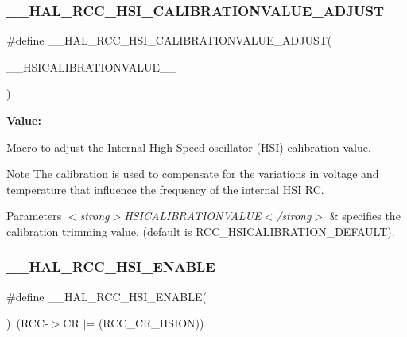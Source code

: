 \subsubsection{\texorpdfstring{\_\_HAL\_RCC\_HSI\_CALIBRATIONVALUE\_ADJUST}{\_\_HAL\_RCC\_HSI\_CALIBRATIONVALUE\_ADJUST}}
{\footnotesize\ttfamily \#define \+\_\+\+\_\+\+H\+A\+L\+\_\+\+R\+C\+C\+\_\+\+H\+S\+I\+\_\+\+C\+A\+L\+I\+B\+R\+A\+T\+I\+O\+N\+V\+A\+L\+U\+E\+\_\+\+A\+D\+J\+U\+ST(\begin{DoxyParamCaption}\item[{}]{\+\_\+\+\_\+\+H\+S\+I\+C\+A\+L\+I\+B\+R\+A\+T\+I\+O\+N\+V\+A\+L\+U\+E\+\_\+\+\_\+ }\end{DoxyParamCaption})}

{\bfseries Value\+:}
\begin{DoxyCode}{0}

\end{DoxyCode}


Macro to adjust the Internal High Speed oscillator (H\+SI) calibration value. 

\begin{DoxyNote}{Note}
The calibration is used to compensate for the variations in voltage and temperature that influence the frequency of the internal H\+SI RC. 
\end{DoxyNote}

\begin{DoxyParams}{Parameters}
{\em $<$strong$>$\+H\+S\+I\+C\+A\+L\+I\+B\+R\+A\+T\+I\+O\+N\+V\+A\+L\+U\+E$<$/strong$>$} & specifies the calibration trimming value. (default is R\+C\+C\+\_\+\+H\+S\+I\+C\+A\+L\+I\+B\+R\+A\+T\+I\+O\+N\+\_\+\+D\+E\+F\+A\+U\+LT). \\
\hline
\end{DoxyParams}
\mbox{\label{group___r_c_c___h_s_i___configuration_gaab944f562b53fc74bcc0e4958388fd42}} 
\subsubsection{\texorpdfstring{\_\_HAL\_RCC\_HSI\_ENABLE}{\_\_HAL\_RCC\_HSI\_ENABLE}}
{\footnotesize\ttfamily \#define \+\_\+\+\_\+\+H\+A\+L\+\_\+\+R\+C\+C\+\_\+\+H\+S\+I\+\_\+\+E\+N\+A\+B\+LE(\begin{DoxyParamCaption}{ }\end{DoxyParamCaption})~(R\+CC-\/$>$CR $\vert$= (R\+C\+C\+\_\+\+C\+R\+\_\+\+H\+S\+I\+ON))}



